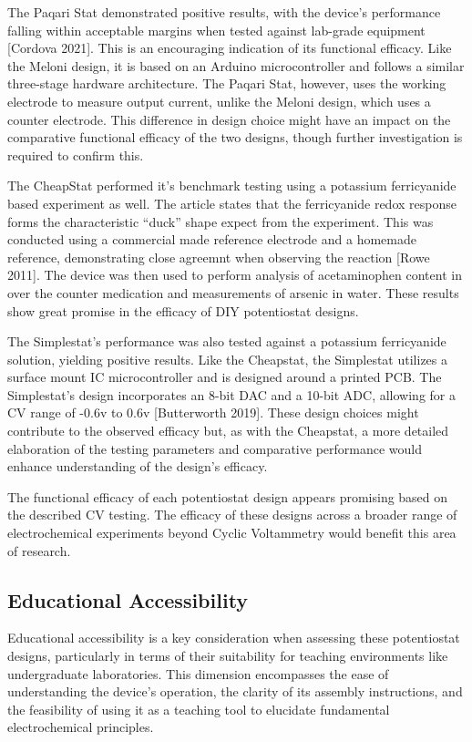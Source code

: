 \documentclass{article}
\begin{document}
The Paqari Stat demonstrated positive results, with the device's performance falling within acceptable margins when tested against lab-grade equipment [Cordova 2021]. This is an encouraging indication of its functional efficacy. Like the Meloni design, it is based on an Arduino microcontroller and follows a similar three-stage hardware architecture. The Paqari Stat, however, uses the working electrode to measure output current, unlike the Meloni design, which uses a counter electrode. This difference in design choice might have an impact on the comparative functional efficacy of the two designs, though further investigation is required to confirm this.

The CheapStat performed it's benchmark testing using a potassium ferricyanide based experiment as well. The article states that the ferricyanide redox response forms the characteristic ``duck'' shape expect from the experiment. This was conducted using a commercial made reference electrode and a homemade reference, demonstrating close agreemnt when observing the reaction [Rowe 2011]. The device was then used to perform analysis of acetaminophen content in over the counter medication and measurements of arsenic in water. These results show great promise in the efficacy of DIY potentiostat designs.

The Simplestat's performance was also tested against a potassium ferricyanide solution, yielding positive results. Like the Cheapstat, the Simplestat utilizes a surface mount IC microcontroller and is designed around a printed PCB. The Simplestat's design incorporates an 8-bit DAC and a 10-bit ADC, allowing for a CV range of -0.6v to 0.6v [Butterworth 2019]. These design choices might contribute to the observed efficacy but, as with the Cheapstat, a more detailed elaboration of the testing parameters and comparative performance would enhance understanding of the design's efficacy.

The functional efficacy of each potentiostat design appears promising based on the described CV testing. The efficacy of these designs across a broader range of electrochemical experiments beyond Cyclic Voltammetry would benefit this area of research.

\subsection*{Educational Accessibility}
Educational accessibility is a key consideration when assessing these potentiostat designs, particularly in terms of their suitability for teaching environments like undergraduate laboratories. This dimension encompasses the ease of understanding the device's operation, the clarity of its assembly instructions, and the feasibility of using it as a teaching tool to elucidate fundamental electrochemical principles.
\end{document}
